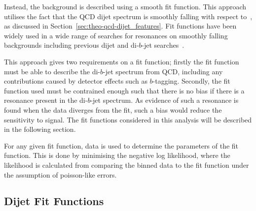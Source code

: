 Instead, the background is described using a smooth fit function.
This approach utilises the fact that the QCD dijet spectrum
is smoothly falling with respect to~\mjj,
as discussed in Section~\ref{sec:theo-qcd-dijet_features}.
Fit functions have been widely used
in a wide range of searches for resonances on smoothly falling backgrounds
including previous dijet and di-$b$-jet searches~\cite{dijet-mori16_paper,dibjet-mori16_paper}.

This approach gives two requirements on a fit function;
firstly the fit function must be able to describe the di-$b$-jet spectrum from QCD,
including any contributions caused by detector effects such as $b$-tagging.
Secondly,  the fit function used must be contrained enough
such that there is no bias if there is a resonance present in the di-$b$-jet spectrum.
As evidence of such a resonance is found when the data diverges from the fit,
such a bias would reduce the sensitivity to signal.
The fit functions considered in this analysis will be described in the following section.

For any given fit function, 
data is used to determine the parameters of the fit function.
This is done by minimising the negative log likelihood,
where the likelihood is calculated from comparing
the binned data to the fit function
under the assumption of poisson-like errors.

\subsection{Dijet Fit Functions}
\label{sec:bkg-bkg_func}



